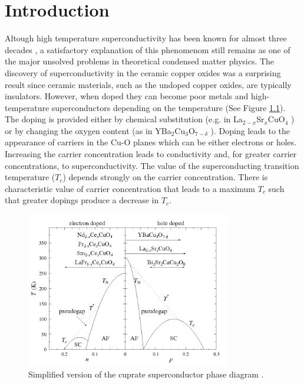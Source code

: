 \chapter{Introduction}
\label{chap:introduction}

Altough high temperature superconductivity has been known for almost three decades \cite{Bednorz1986}, a satisfactory explanation of this phenomenom still remains as one of the major unsolved problems in theoretical condensed matter physics. 
The discovery of superconductivity in the ceramic copper oxides was a surprising result since ceramic materials, such as the undoped copper oxides, are typically insulators.
However, when doped they can become poor metals and high-temperature superconductors depending on the temperature (See Figure \ref{fig:CuPhaseDiag}). 
The doping is provided either by chemical substitution (e.g. in La$_{2-x}$Sr$_x$CuO$_4$ \cite{Cava1987}) or by changing the oxygen content (as in YBa$_2$Cu$_3$O$_{7-\delta}$ \cite{Wu1987}). 
Doping leads to the appearance of carriers in the Cu-O planes which can be either electrons or holes.
Increasing the carrier concentration leads to conductivity and, for greater carrier concentrations, to superconductivity. 
The value of the superconducting transition temperature ($T_c$) depends strongly on the carrier concentration.
There is characteristic value of carrier concentration that leads to a maximum $T_c$ such that greater dopings produce a decrease in $T_c$.

\begin{figure}[ht]
  \centering
  \includegraphics[width=0.8\textwidth]{images/CuPhaseDiag.png}
  \caption[Simplified version of the cuprate superconductor phase diagram]
  {Simplified version of the cuprate superconductor phase diagram \protect\cite{CuPhaseDiag}.}
  \label{fig:CuPhaseDiag}
\end{figure}

